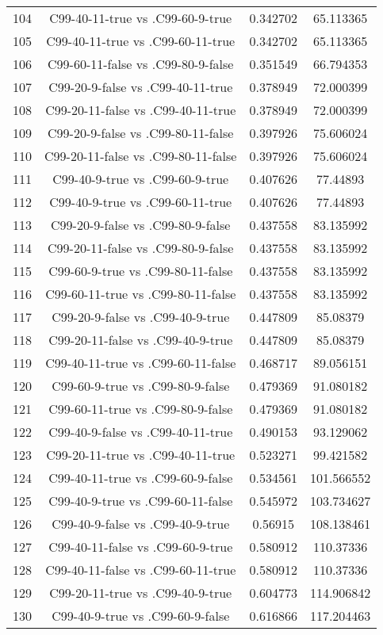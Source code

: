 \documentclass[a4paper,10pt]{article}
\begin{document}
\begin{landscape}
\begin{table}[!htp]
\begin{tabular}{cccc}
104&C99-40-11-true vs .C99-60-9-true&0.342702&65.113365\\
105&C99-40-11-true vs .C99-60-11-true&0.342702&65.113365\\
106&C99-60-11-false vs .C99-80-9-false&0.351549&66.794353\\
107&C99-20-9-false vs .C99-40-11-true&0.378949&72.000399\\
108&C99-20-11-false vs .C99-40-11-true&0.378949&72.000399\\
109&C99-20-9-false vs .C99-80-11-false&0.397926&75.606024\\
110&C99-20-11-false vs .C99-80-11-false&0.397926&75.606024\\
111&C99-40-9-true vs .C99-60-9-true&0.407626&77.44893\\
112&C99-40-9-true vs .C99-60-11-true&0.407626&77.44893\\
113&C99-20-9-false vs .C99-80-9-false&0.437558&83.135992\\
114&C99-20-11-false vs .C99-80-9-false&0.437558&83.135992\\
115&C99-60-9-true vs .C99-80-11-false&0.437558&83.135992\\
116&C99-60-11-true vs .C99-80-11-false&0.437558&83.135992\\
117&C99-20-9-false vs .C99-40-9-true&0.447809&85.08379\\
118&C99-20-11-false vs .C99-40-9-true&0.447809&85.08379\\
119&C99-40-11-true vs .C99-60-11-false&0.468717&89.056151\\
120&C99-60-9-true vs .C99-80-9-false&0.479369&91.080182\\
121&C99-60-11-true vs .C99-80-9-false&0.479369&91.080182\\
122&C99-40-9-false vs .C99-40-11-true&0.490153&93.129062\\
123&C99-20-11-true vs .C99-40-11-true&0.523271&99.421582\\
124&C99-40-11-true vs .C99-60-9-false&0.534561&101.566552\\
125&C99-40-9-true vs .C99-60-11-false&0.545972&103.734627\\
126&C99-40-9-false vs .C99-40-9-true&0.56915&108.138461\\
127&C99-40-11-false vs .C99-60-9-true&0.580912&110.37336\\
128&C99-40-11-false vs .C99-60-11-true&0.580912&110.37336\\
129&C99-20-11-true vs .C99-40-9-true&0.604773&114.906842\\
130&C99-40-9-true vs .C99-60-9-false&0.616866&117.204463\\

\end{tabular}
\end{table}
\end{landscape}
\end{document}
